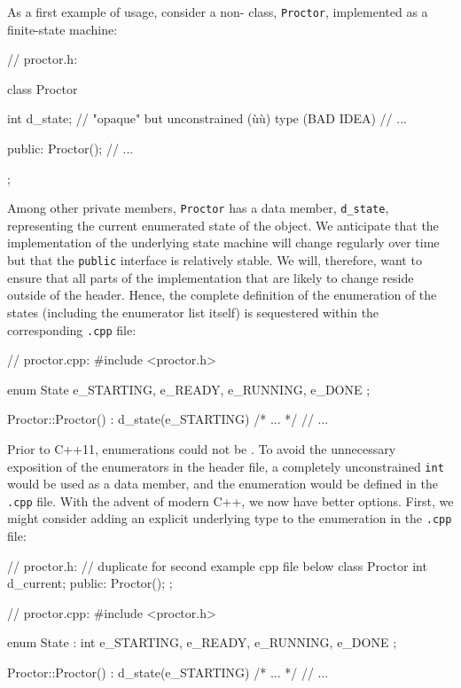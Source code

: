As a first example of  usage, consider a
non-  class, \lstinline!Proctor!,
implemented as a finite-state machine:

\begin{emcppslisting}[emcppsbatch=e2]
// proctor.h:

class Proctor
{
    int d_state;  // "opaque" but unconstrained (ù{}ù) type (BAD IDEA)
    // ...

public:
    Proctor();
    // ...
};
\end{emcppslisting}

\noindent Among other private members, \lstinline!Proctor! has a data member,
\lstinline!d_state!, representing the current enumerated state of
the object. We anticipate that the implementation of the underlying
state machine will change regularly over time but that the
\lstinline!public! interface is relatively stable. We will, therefore, want
to ensure that all parts of the implementation that are likely to change
reside outside of the header. Hence, the complete definition of the
enumeration of the states (including the enumerator list itself) is
sequestered within the corresponding \lstinline!.cpp! file:

\begin{emcppslisting}[emcppsbatch=e2]
// proctor.cpp:
#include <proctor.h>

enum State { e_STARTING, e_READY, e_RUNNING, e_DONE };

Proctor::Proctor() : d_state(e_STARTING) { /* ... */ }
// ...
\end{emcppslisting}

\noindent Prior to C++11, enumerations could not be . To avoid the unnecessary exposition of the enumerators in the header file,  a completely unconstrained \lstinline!int! would be used as a data member, and the enumeration would be defined in the \lstinline!.cpp! file. With
the advent of modern C++, we now have better options. First, we might
consider adding an explicit underlying type to the enumeration in the
\lstinline!.cpp! file:

\begin{emcppshiddenlisting}[emcppsbatch=e3]
// proctor.h:
// duplicate for second example cpp file below
class Proctor
{
    int d_current;
public:
    Proctor();
};
\end{emcppshiddenlisting}
\begin{emcppslisting}[emcppsbatch=e3]
// proctor.cpp:
#include <proctor.h>

enum State : int { e_STARTING, e_READY, e_RUNNING, e_DONE };

Proctor::Proctor() : d_state(e_STARTING) { /* ... */ }
// ...
\end{emcppslisting}

